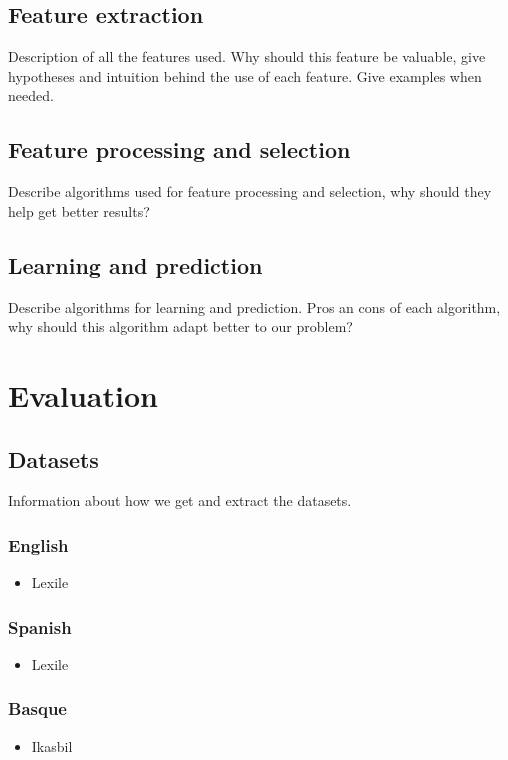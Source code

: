\documentclass[12pt]{article}
\begin{document}
\subsection{Feature extraction}
Description of all the features used. Why should this feature be valuable, give hypotheses and intuition behind the use of each feature. Give examples when needed.

\subsection{Feature processing and selection}
Describe algorithms used for feature processing and selection, why should they help get better results?

\subsection{Learning and prediction}
Describe algorithms for learning and prediction. Pros an cons of each algorithm, why should this algorithm adapt better to our problem?

\section{Evaluation}

\subsection{Datasets}
Information about how we get and extract the datasets.
\subsubsection{English}
\begin{itemize}
\item Lexile
\end{itemize}
\subsubsection{Spanish}
\begin{itemize}
\item Lexile
\end{itemize}
\subsubsection{Basque}
\begin{itemize}
\item Ikasbil
\end{itemize}
\end{document}
